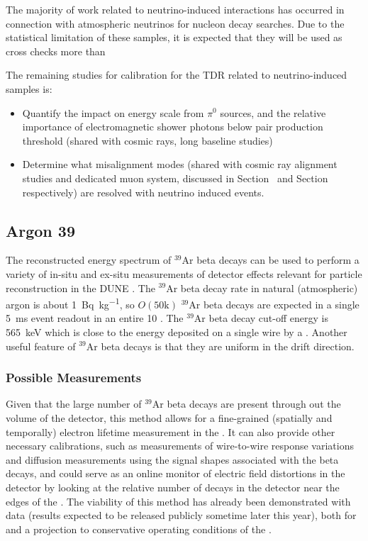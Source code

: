 The majority of work related to neutrino-induced interactions has occurred in connection with atmospheric neutrinos for nucleon decay searches. Due to the statistical limitation of these samples, it is expected that they will be used as cross checks more than 

The remaining studies for calibration for the TDR related to neutrino-induced samples is:
\begin{itemize}
\item Quantify the impact on energy scale from $\pi^0$ sources, and the relative importance of electromagnetic shower photons below pair production threshold (shared with cosmic rays, long baseline studies)
\item Determine what misalignment modes (shared with cosmic ray alignment studies and dedicated muon system, discussed in Section~\cite{sec:cr} and Section~\cite{sec:crt} respectively) are resolved with neutrino induced events.
\end{itemize}


\subsection{Argon 39}
\label{sec:ar39}
The reconstructed energy spectrum of ${}^{39}$Ar beta decays can be used to perform a variety of in-situ and ex-situ measurements of detector effects relevant for particle reconstruction in the DUNE \fardet. The ${}^{39}$Ar beta decay rate in natural (atmospheric) argon is about \SI{1}{\becquerel\per\kilo\gram}, so $O(\mathrm{50k})$ ${}^{39}$Ar beta decays are expected in a single \SI{5}{\milli\s} event readout in an entire \SI{10}{\kt} \detmodule. The ${}^{39}$Ar beta decay cut-off energy is \SI{565}{\keV} which is close to the energy deposited on a single wire by a . Another useful feature of ${}^{39}$Ar beta decays is that they are uniform in the drift direction.

\subsubsection{Possible Measurements}
Given that the large number of ${}^{39}$Ar beta decays are present through out the volume of the detector, this method allows for a fine-grained (spatially and temporally) electron lifetime measurement in the . %
 It can also provide other necessary calibrations, such as measurements of wire-to-wire response variations and diffusion measurements using the signal shapes associated with the beta decays, and could serve as an online monitor of electric field distortions in the detector by looking at the relative number of decays in the detector near the edges of the . The viability of this method has already been demonstrated with \microboone data (results expected to be released publicly sometime later this year), both for \microboone and a projection to conservative operating conditions of the \fardet. %

